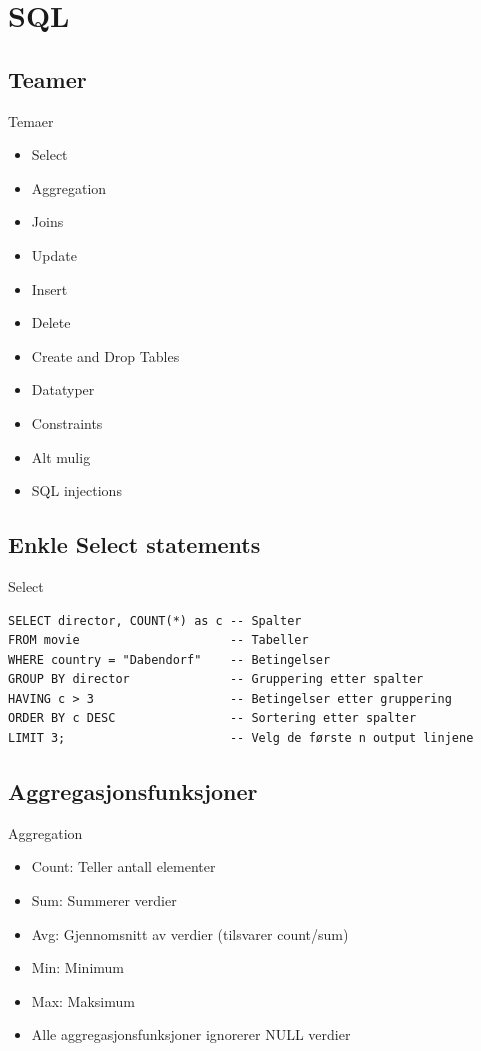 \section{SQL}
\subsection*{Teamer}
\begin{frame}{Temaer}
\begin{itemize}
    \item Select
    \item Aggregation
    \item Joins
    \item Update
    \item Insert
    \item Delete
    \item Create and Drop Tables
    \item Datatyper
    \item Constraints
    \item Alt mulig
    \item SQL injections
\end{itemize}
\end{frame}

\subsection*{Enkle Select statements}
\begin{frame}[fragile]{Select}
\begin{verbatim}
SELECT director, COUNT(*) as c -- Spalter
FROM movie                     -- Tabeller
WHERE country = "Dabendorf"    -- Betingelser
GROUP BY director              -- Gruppering etter spalter
HAVING c > 3                   -- Betingelser etter gruppering
ORDER BY c DESC                -- Sortering etter spalter 
LIMIT 3;                       -- Velg de første n output linjene
\end{verbatim}
\end{frame}

\subsection*{Aggregasjonsfunksjoner}
\begin{frame}[fragile]{Aggregation}
\begin{itemize}[<+->]
    \item Count: Teller antall elementer
    \item Sum: Summerer verdier
    \item Avg: Gjennomsnitt av verdier (tilsvarer count/sum)
    \item Min: Minimum
    \item Max: Maksimum
    \item Alle aggregasjonsfunksjoner ignorerer NULL verdier
\end{itemize}
\end{frame}


